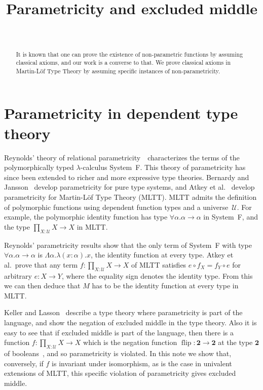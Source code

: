 \documentclass[a4paper,UKenglish]{lipics-v2016}
\title{Parametricity and excluded middle}
\author{~}
\newcommand{\comp}{\mathrel{\circ}}
\newcommand{\UU}{\mathcal{U}}
\newcommand{\bool}{\mathbf{2}}
\newcommand{\flip}{\operatorname{flip}}
\begin{document}
\maketitle

\begin{abstract}


  It is known that one can prove the existence of non-parametric
  functions by assuming classical axioms, and our work is a converse
  to that.  We prove classical axioms in Martin-Löf Type Theory by
  assuming specific instances of non-parametricity.

\end{abstract}

\section{Parametricity in dependent type theory}

Reynolds' theory of relational
parametricity~\cite{DBLP:conf/ifip/Reynolds83}~characterizes the terms
of the polymorphically typed $\lambda$-calculus System~F.  This theory
of parametricity has since been extended to richer and more expressive
type theories. Bernardy and
Jansson~\cite{DBLP:journals/jfp/BernardyJP12} develop parametricity
for pure type systems, and Atkey et
al.~\cite{DBLP:conf/popl/AtkeyGJ14} develop parametricity for
Martin-L\"of Type Theory (MLTT).  MLTT admits the definition of
polymorphic functions using dependent function types and a
universe~$\UU$.  For example, the polymorphic identity function has
type $\forall \alpha . \alpha \to \alpha$ in System~F, and the type
$\prod_{X : \UU} X \to X$ in MLTT.\@

Reynolds' parametricity results show that the only term of System~F
with type $\forall \alpha . \alpha \to \alpha$ is
$\Lambda \alpha. \lambda (x:\alpha).x$, the identity function at every
type.  Atkey et al.\ prove that any term $f:\prod_{X : \UU} X \to X$
of MLTT satisfies $e \comp f_X =f_Y \comp e$ for arbitrary
$e : X \to Y$, where the equality sign denotes the identity type.
From this we can then deduce that
$M$ has to be the identity function at every type in MLTT.

Keller and Lasson~\cite{DBLP:conf/csl/KellerL12} describe a type
theory where parametricity is part of the language, and show the
negation of excluded middle in the type theory.  Also it is easy to
see that if excluded middle is part of the language, then there is a
function $f : \prod_{X : \UU} X \to X$ which is the negation function
$\flip:\bool\to\bool$ at the type $\bool$ of
booleans~\cite[Exercise~6.9]{hottbook}, and so parametricity is
violated.  In this note we show that, conversely, if $f$ is invariant
under isomorphism, as is the case in univalent extensions of MLTT,
this specific violation of parametricity gives excluded middle.
\end{document}
